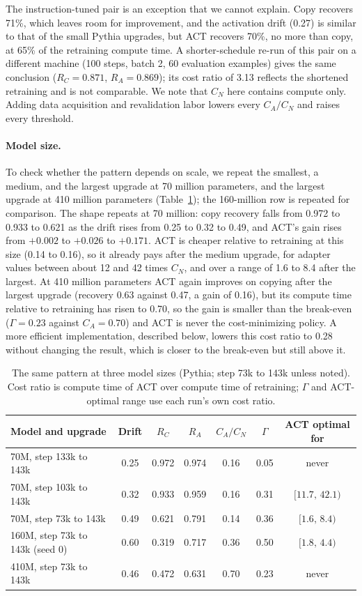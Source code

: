 \documentclass[preprint,12pt,authoryear]{elsarticle}
\begin{document}
The instruction-tuned pair is an exception that we cannot explain. Copy recovers 71\%, which leaves room for improvement, and the activation drift (0.27) is similar to that of the small Pythia upgrades, but ACT recovers 70\%, no more than copy, at 65\% of the retraining compute time.
A shorter-schedule re-run of this pair on a different machine (100 steps, batch 2, 60 evaluation examples) gives the same conclusion ($R_C=0.871$, $R_A=0.869$); its cost ratio of 3.13 reflects the shortened retraining and is not comparable.
We note that $C_N$ here contains compute only. Adding data acquisition and revalidation labor lowers every $C_A/C_N$ and raises every threshold.

\paragraph{Model size.} To check whether the pattern depends on scale, we repeat the smallest, a medium, and the largest upgrade at 70 million parameters, and the largest upgrade at 410 million parameters (Table~\ref{tab:scale}); the 160-million row is repeated for comparison.
The shape repeats at 70 million: copy recovery falls from 0.972 to 0.933 to 0.621 as the drift rises from 0.25 to 0.32 to 0.49, and ACT's gain rises from $+0.002$ to $+0.026$ to $+0.171$. ACT is cheaper relative to retraining at this size (0.14 to 0.16), so it already pays after the medium upgrade, for adapter values between about 12 and 42 times $C_N$, and over a range of 1.6 to 8.4 after the largest.
At 410 million parameters ACT again improves on copying after the largest upgrade (recovery 0.63 against 0.47, a gain of 0.16), but its compute time relative to retraining has risen to 0.70, so the gain is smaller than the break-even ($\Gamma=0.23$ against $C_A=0.70$) and ACT is never the cost-minimizing policy. A more efficient implementation, described below, lowers this cost ratio to 0.28 without changing the result, which is closer to the break-even but still above it.

\begin{table}[t]
\centering
\caption{The same pattern at three model sizes (Pythia; step 73k to 143k unless noted). Cost ratio is compute time of ACT over compute time of retraining; $\Gamma$ and ACT-optimal range use each run's own cost ratio.}\label{tab:scale}
\begin{tabular}{lcccccc}
\toprule
Model and upgrade & Drift & $R_C$ & $R_A$ & $C_A/C_N$ & $\Gamma$ & ACT optimal for\\
\midrule
70M, step 133k to 143k & 0.25 & 0.972 & 0.974 & 0.16 & 0.05 & never\\
70M, step 103k to 143k & 0.32 & 0.933 & 0.959 & 0.16 & 0.31 & $[11.7,\,42.1)$\\
70M, step 73k to 143k & 0.49 & 0.621 & 0.791 & 0.14 & 0.36 & $[1.6,\,8.4)$\\
160M, step 73k to 143k (seed 0) & 0.60 & 0.319 & 0.717 & 0.36 & 0.50 & $[1.8,\,4.4)$\\
410M, step 73k to 143k & 0.46 & 0.472 & 0.631 & 0.70 & 0.23 & never\\
\bottomrule
\end{tabular}
\end{table}
\end{document}
